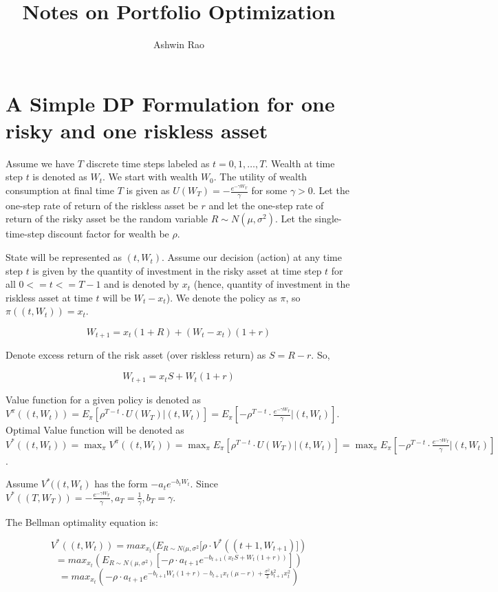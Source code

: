 \documentclass[12pt]{amsart}
\title{Notes on Portfolio Optimization}
\author{Ashwin Rao}
\date{} %
\begin{document}
\maketitle

\section{A Simple DP Formulation for one risky and one riskless asset}

Assume we have $T$ discrete time steps labeled as $t = 0, 1, \ldots, T$. Wealth at time step $t$ is denoted as $W_t$. We start with wealth $W_0$. The utility of wealth consumption at final time $T$ is given as $U(W_T) = - \frac {e^{-\gamma W_T}} {\gamma}$ for some $\gamma > 0$. Let the one-step rate of return of the riskless asset be $r$ and let the one-step rate of return of the risky asset be the random variable $R \sim N(\mu, \sigma^2)$. Let the single-time-step discount factor for wealth be $\rho$.

State will be represented as $(t, W_t)$. Assume our decision (action) at any time step $t$ is given by the quantity of investment in the risky asset at time step $t$ for all $0 <= t <= T-1$ and is denoted by $x_t$ (hence, quantity of investment in the riskless asset at time $t$ will be $W_t - x_t$). We denote the policy as $\pi$, so $\pi((t, W_t)) = x_t$.

$$W_{t+1} = x_t (1 + R) + (W_t - x_t) (1 + r)$$

Denote excess return of the risk asset (over riskless return) as $S = R - r$. So,

$$W_{t+1} = x_t S + W_t (1 + r)$$



Value function for a given policy is denoted as $V^{\pi}((t, W_t)) = E_{\pi}[\rho^{T-t} \cdot U(W_T) | (t, W_t)] = E_{\pi}[- \rho^{T-t} \cdot \frac {e^{-\gamma W_T}} {\gamma} | (t, W_t)]$. Optimal Value function will be denoted as $V^*((t, W_t)) = \max_{\pi} V^{\pi}((t, W_t)) = \max_{\pi} E_{\pi}[\rho^{T-t} \cdot U(W_T) | (t, W_t)] = \max_{\pi} E_{\pi}[-\rho^{T-t} \cdot \frac {e^{-\gamma W_T}} {\gamma} | (t, W_t)]$.

 Assume $V^*((t, W_t)$ has the form $-a_t e^{-b_t W_t}$. Since $V^*((T, W_T)) = - \frac {e^{-\gamma W_T}} {\gamma}, a_T = \frac 1 {\gamma}, b_T = \gamma$.

The Bellman optimality equation is:

$$V^*((t, W_t)) = max_{x_t} (E_{R \sim N(\mu, \sigma^2}[\rho \cdot V^*((t+1, W_{t+1})])$$
$$ = max_{x_t} (E_{R \sim N(\mu, \sigma^2)} [- \rho \cdot a_{t+1} e^{-b_{t+1} (x_t S + W_t(1+r))}])$$
$$ = max_{x_t} (- \rho \cdot a_{t+1} e^{-b_{t+1}W_t(1+r) - b_{t+1} x_t (\mu - r) + \frac {\sigma^2} {2} b^2_{t+1} x_t^2})$$
\end{document}
